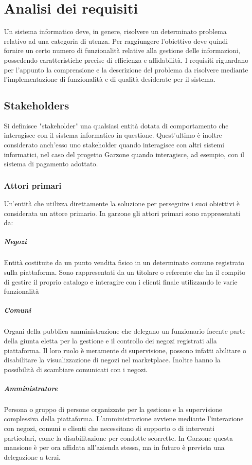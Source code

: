 \chapter{Analisi dei requisiti}
Un sistema informatico deve, in genere, risolvere un determinato problema relativo ad una categoria di utenza. Per raggiungere l'obiettivo deve quindi fornire un certo numero di funzionalità relative alla gestione delle informazioni, possedendo caratteristiche precise di efficienza e affidabilità. I requisiti riguardano per l'appunto la comprensione e la descrizione del problema da risolvere mediante l'implementazione di funzionalità e di qualità desiderate per il sistema.
\section{Stakeholders}
Si definisce "stakeholder" una qualsiasi entità dotata di comportamento che interagisce con il sistema informatico in questione. Quest'ultimo è inoltre considerato anch'esso uno stakeholder quando interagisce con altri sistemi informatici, nel caso del progetto Garzone  quando interagisce, ad esempio, con il sistema di pagamento adottato.
\subsection{Attori primari}
Un'entità che utilizza direttamente la soluzione per perseguire i suoi obiettivi è considerata un attore primario. In garzone gli attori primari sono rappresentati da:
\paragraph{Negozi} Entità costituite da un punto vendita fisico in un determinato comune registrato sulla piattaforma. Sono rappresentati da un titolare o referente che ha il compito di gestire il proprio catalogo e interagire con i clienti finale utilizzando le varie funzionalità
\paragraph{Comuni} Organi della pubblica amministrazione che delegano un funzionario facente parte della giunta eletta per la gestione e il controllo dei negozi registrati alla piattaforma. Il loro ruolo è meramente di supervisione, possono infatti abilitare o disabilitare la visualizzazione di negozi nel marketplace. Inoltre hanno la possibilità di scambiare comunicati con i negozi.
\paragraph{Amministratore} Persona o gruppo di persone organizzate per la gestione e la supervisione complessiva della piattaforma. L'amministrazione avviene mediante l'interazione con negozi, comuni e clienti che necessitano di supporto o di interventi particolari, come la disabilitazione per condotte scorrette. In Garzone questa mansione è per ora affidata all'azienda stessa, ma in futuro è prevista una delegazione a terzi.
